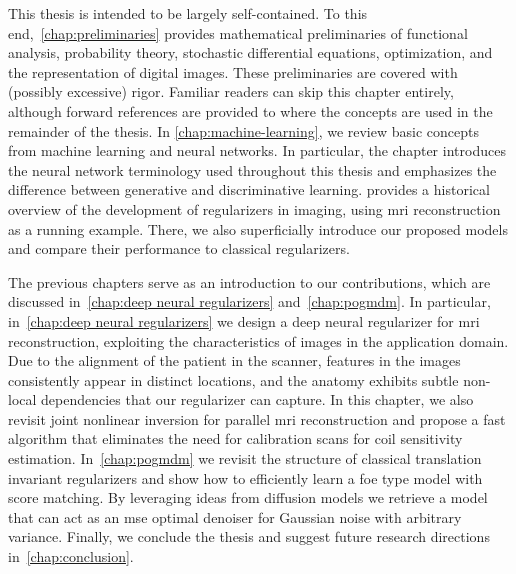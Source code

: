 This thesis is intended to be largely self-contained.
To this end,~\cref{chap:preliminaries} provides mathematical preliminaries of functional analysis, probability theory, stochastic differential equations, optimization, and the representation of digital images.
These preliminaries are covered with (possibly excessive) rigor.
Familiar readers can skip this chapter entirely, although forward references are provided to where the concepts are used in the remainder of the thesis.
In \cref{chap:machine-learning}, we review basic concepts from machine learning and neural networks.
In particular, the chapter introduces the neural network terminology used throughout this thesis and emphasizes the difference between generative and discriminative learning.
 provides a historical overview of the development of regularizers in imaging, using \gls{mri} reconstruction as a running example.
There, we also superficially introduce our proposed models and compare their performance to classical regularizers.

The previous chapters serve as an introduction to our contributions, which are discussed in~\cref{chap:deep neural regularizers} and~\cref{chap:pogmdm}.
In particular, in~\cref{chap:deep neural regularizers} we design a deep neural regularizer for \gls{mri} reconstruction, exploiting the characteristics of images in the application domain.
Due to the alignment of the patient in the scanner, features in the images consistently appear in distinct locations, and the anatomy exhibits subtle non-local dependencies that our regularizer can capture.
In this chapter, we also revisit joint nonlinear inversion for parallel \gls{mri} reconstruction and propose a fast algorithm that eliminates the need for calibration scans for coil sensitivity estimation.
In~\cref{chap:pogmdm} we revisit the structure of classical translation invariant regularizers and show how to efficiently learn a \gls{foe} type model with score matching.
By leveraging ideas from diffusion models we retrieve a model that can act as an \gls{mse} optimal denoiser for Gaussian noise with arbitrary variance.
Finally, we conclude the thesis and suggest future research directions in~\cref{chap:conclusion}.

